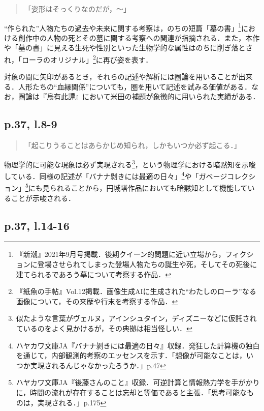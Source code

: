 \documentclass[10pt, a5paper, twoside]{jsarticle}
\theoremstyle{definition}
\begin{document}
		\begin{quote}

			「姿形はそっくりなのだが，〜」

		\end{quote}

		“作られた”人物たちの過去や未来に関する考察は，のちの短篇「墓の書」\footnote{『新潮』2021年9月号掲載．後期クイーン的問題に近い立場から，フィクションに登場させられてしまった登場人物たちの誕生や死，そしてその死後に建てられるであろう墓について考察する作品．}における創作中の人物の死とその墓に関する考察への関連が指摘される．また，本作や「墓の書」に見える生死や性別といった生物学的な属性はのちに削ぎ落とされ，「ローラのオリジナル」\footnote{『紙魚の手帖』Vol.12掲載．画像生成AIに生成された“わたしのローラ”なる画像について，その来歴や行末を考察する作品．}に再び姿を表す．

		対象の間に矢印があるとき，それらの記述や解析には圏論を用いることが出来る．人形たちの“血縁関係”についても，圏を用いて記述を試みる価値がある．なお，圏論は『烏有此譚』において米田の補題が象徴的に用いられた実績がある．

		\subsection{p.37, l.8-9}

		\begin{quote}

			「起こりうることはあらかじめ知られ，しかもいつか必ず起こる．」

		\end{quote}

		物理学的に可能な現象は必ず実現される\footnote{似たような言葉がヴェルヌ，アインシュタイン，ディズニーなどに仮託されているのをよく見かけるが，その典拠は相当怪しい．}，という物理学における暗黙知を示唆している．同様の記述が「バナナ剝きには最適の日々」\footnote{ハヤカワ文庫JA『バナナ剝きには最適の日々』収録．発狂した計算機の独白を通じて，内部観測的考察のエッセンスを示す．「想像が可能なことは，いつか実現されるんじゃなかったろうか．」p.47}や「ガベージコレクション」\footnote{ハヤカワ文庫JA『後藤さんのこと』収録．可逆計算と情報熱力学を手がかりに，時間の流れが存在することは忘却と等価であると主張．「思考可能なものは，実現される．」p.175}にも見られることから，円城塔作品においても暗黙知として機能していることが示唆される．

		\subsection{p.37, l.14-16}
\end{document}
